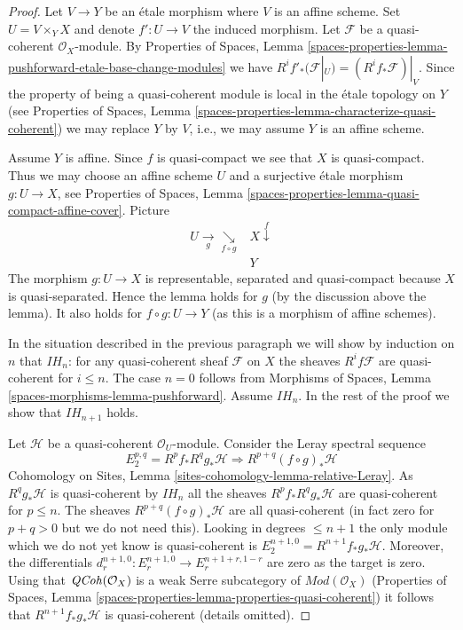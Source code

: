 \begin{proof}
Let $V \to Y$ be an \'etale morphism where $V$ is an affine scheme. Set
$U = V \times_Y X$ and denote $f' : U \to V$ the induced morphism.
Let $\mathcal{F}$ be a quasi-coherent $\mathcal{O}_X$-module. By
Properties of Spaces, Lemma
\ref{spaces-properties-lemma-pushforward-etale-base-change-modules}
we have
$R^if'_*(\mathcal{F}|_U) = (R^if_*\mathcal{F})|_V$.
Since the property of being a quasi-coherent module is local in the
\'etale topology on $Y$ (see
Properties of Spaces, Lemma
\ref{spaces-properties-lemma-characterize-quasi-coherent})
we may replace $Y$ by $V$, i.e., we may assume $Y$ is an affine scheme.

\medskip\noindent
Assume $Y$ is affine. Since $f$ is quasi-compact we see that $X$
is quasi-compact. Thus we may choose an affine scheme $U$ and a surjective
\'etale morphism $g : U \to X$, see
Properties of Spaces,
Lemma \ref{spaces-properties-lemma-quasi-compact-affine-cover}.
Picture
$$
\begin{array}{cc}U \underset{g}{\longrightarrow}\underset{f \circ g}{\searrow} & X \overset{f}{\downarrow} \\  & Y\end{array}
$$
The morphism $g : U \to X$ is representable, separated
and quasi-compact because $X$ is quasi-separated. Hence the lemma
holds for $g$ (by the discussion above the lemma).
It also holds for $f \circ g : U \to Y$ (as this is a morphism
of affine schemes).

\medskip\noindent
In the situation described in the previous paragraph we will show by
induction on $n$ that $IH_n$: for any quasi-coherent sheaf $\mathcal{F}$
on $X$ the sheaves $R^if\mathcal{F}$
are quasi-coherent for $i \leq n$.
The case $n = 0$ follows from
Morphisms of Spaces, Lemma \ref{spaces-morphisms-lemma-pushforward}.
Assume $IH_n$. In the rest of the proof we show that $IH_{n + 1}$ holds.

\medskip\noindent
Let $\mathcal{H}$ be a quasi-coherent $\mathcal{O}_U$-module.
Consider the Leray spectral sequence
$$
E_2^{p, q} = R^pf_* R^qg_* \mathcal{H}
\Rightarrow
R^{p + q}(f \circ g)_*\mathcal{H}
$$
Cohomology on Sites, Lemma \ref{sites-cohomology-lemma-relative-Leray}.
As $R^qg_*\mathcal{H}$ is quasi-coherent by $IH_n$ all the sheaves
$R^pf_*R^qg_*\mathcal{H}$ are quasi-coherent for $p \leq n$.
The sheaves $R^{p + q}(f \circ g)_*\mathcal{H}$ are all
quasi-coherent (in fact zero for $p + q > 0$ but we do not need this).
Looking in degrees $\leq n + 1$ the only module which we do not
yet know is quasi-coherent is $E_2^{n + 1, 0} = R^{n + 1}f_*g_*\mathcal{H}$.
Moreover, the differentials
$d_r^{n + 1, 0} : E_r^{n + 1, 0} \to E_r^{n + 1 + r, 1 - r}$
are zero as the target is zero. Using that $\mathit{QCoh}(\mathcal{O}_X)$
is a weak Serre subcategory of $\textit{Mod}(\mathcal{O}_X)$
(Properties of Spaces, Lemma
\ref{spaces-properties-lemma-properties-quasi-coherent}) it
follows that $R^{n + 1}f_*g_*\mathcal{H}$
is quasi-coherent (details omitted).


\end{proof}
